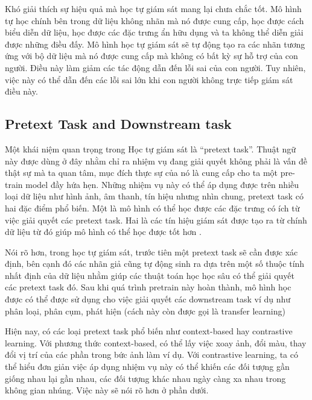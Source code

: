 Khó giải thích sự hiệu quả mà học tự giám sát mang lại chưa chắc tốt. Mô hình tự học chính bên trong dữ liệu không nhãn mà nó được cung cấp, học được cách biểu diễn dữ liệu, học được các đặc trưng ẩn hữu dụng và ta không thể diễn giải được những điều đấy. Mô hình học tự giám sát sẽ tự động tạo ra các nhãn tương ứng với bộ dữ liệu mà nó được cung cấp mà không có bất kỳ sự hỗ trợ của con người. Điều này làm giảm các tác động dẫn đến lỗi sai của con người. Tuy nhiên, việc này có thể dẫn đến các lỗi sai lớn khi con người không trực tiếp giám sát điều này.

\subsection{Pretext Task and Downstream task}

\noindent Một khái niệm quan trọng trong Học tự giám sát là ``pretext task''.  Thuật ngữ này được dùng ở đây nhằm chỉ ra nhiệm vụ đang giải quyết không phải là vấn đề thật sự mà ta quan tâm, mục đích thực sự của nó là cung cấp cho ta một pre-train model đầy hứa hẹn. Những nhiệm vụ này có thể áp dụng được trên nhiều loại dữ liệu như hình ảnh, âm thanh, tín hiệu nhưng nhìn chung, pretext task có hai đặc điểm phổ biến. Một là mô hình có thể học được các đặc trưng có ích từ việc giải quyết các pretext task. Hai là các tín hiệu giám sát được tạo ra từ chính dữ liệu từ đó giúp mô hình có thể  học được tốt hơn \cite{survey:ssl-from-perspectives}.

Nói rõ hơn, trong học tự giám sát, trước tiên một pretext task sẽ cần được xác định, bên cạnh đó các nhãn giả cũng tự động sinh ra dựa trên một số thuộc tính nhất định của dữ liệu nhằm giúp các thuật toán học học sâu có thể giải quyết các pretext task đó. Sau khi quá trình pretrain này hoàn thành, mô hình học được có thể được sử dụng cho việc giải quyết các downstream task ví dụ như phân loại, phân cụm, phát hiện (cách này còn được gọi là transfer learning)

Hiện nay, có các loại pretext task phổ biến như context-based hay contrastive learning. Với phương thức context-based, có thể lấy việc xoay ảnh, đổi màu, thay đổi vị trí của các phần trong bức ảnh làm ví dụ. Với contrastive learning, ta có thể hiểu đơn giản việc áp dụng nhiệm vụ này có thể khiến các đối tượng gần giống nhau lại gần nhau, các đối tượng khác nhau ngày càng xa nhau trong không gian nhúng. Việc này sẽ nói rõ hơn ở phần dưới.
